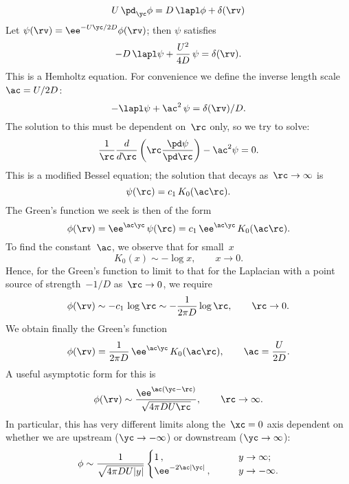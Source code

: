 \documentclass[notitlepage,12pt]{article}
\renewcommand{\l}{\left}
\renewcommand{\r}{\right}
\begin{document}
\begin{equation}
  U\,\pd_\yc \phi = D\,\lapl\phi + \delta(\rv)
\end{equation}
Let $\psi(\rv) = \ee^{-U\yc/2D}\phi(\rv)$; then $\psi$ satisfies
\begin{equation}
  -D\,\lapl\psi + \frac{U^2}{4D}\,\psi = \delta(\rv).
  \label{eq:Helm0}
\end{equation}
This is a Hemholtz equation.  For convenience we define the inverse length
scale~$\ac = U/2D$:
\begin{equation}
  -\lapl\psi + \ac^2\,\psi = \delta(\rv)/D.
  \label{eq:Helm}
\end{equation}
The solution to this must be dependent on~$\rc$ only, so we try to solve:
\begin{equation}
  \frac{1}{\rc}\frac{d}{d\rc}\l(\rc\frac{\pd\psi}{\pd\rc}\r)
  -
  \ac^2\psi = 0.
\end{equation}
This is a modified Bessel equation; the solution that decays
as~$\rc\rightarrow\infty$ is
\begin{equation}
  \psi(\rc) = c_1\,K_0(\ac\rc).
\end{equation}
The Green's function we seek is then of the form
\begin{equation}
  \phi(\rv)
  =
  \ee^{\ac\yc}\,\psi(\rc)
  =
  c_1\,\ee^{\ac\yc}\,K_0(\ac\rc).
\end{equation}
To find the constant~$\ac$, we observe that for small~$x$
\begin{equation}
  K_0(x) \sim -\log x,
  \qquad
  x \rightarrow 0.
\end{equation}
Hence, for the Green's function to limit to that for the Laplacian with a
point source of strength~$-1/D$ as~$\rc\rightarrow0$, we require
\begin{equation}
  \phi(\rv)
  \sim
  -c_1\,\log\rc
  \sim
  -\frac{1}{2\pi D}\log\rc,
  \qquad
  \rc \rightarrow 0.
\end{equation}
We obtain finally the Green's function
\begin{equation}
  \phi(\rv)
  =
  \frac{1}{2\pi D}\,\ee^{\ac\yc}\,K_0(\ac\rc),
  \qquad
  \ac = \frac{U}{2D}.
  \label{eq:GF}
\end{equation}
A useful asymptotic form for this is
\begin{equation}
  \phi(\rv) \sim \frac{\ee^{\ac(\yc - \rc)}}{\sqrt{4\pi D U \rc}},
  \qquad
  \rc \rightarrow\infty.
  \label{eq:GFasym}
\end{equation}
In particular, this has very different limits along the~$\xc=0$ axis dependent
on whether we are upstream ($\yc \rightarrow -\infty$) or downstream
($\yc \rightarrow \infty$):
\begin{equation}
  \phi \sim \frac{1}{\sqrt{4\pi D U \lvert y\rvert}}
  \begin{cases}
    1\,, \qquad &y \rightarrow \infty; \\
    \ee^{-2\ac|\yc|}\,, \qquad &y \rightarrow -\infty.
  \end{cases}
\end{equation}
\end{document}
